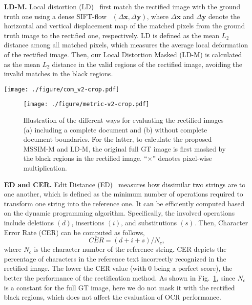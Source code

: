 \documentclass[lettersize,journal]{IEEEtran}
\begin{document}
\smallskip
\textbf{LD-M.} Local distortion (LD)~\cite{Shaodi} first match the rectified image with the ground truth one using a dense SIFT-flow~\cite{5551153} $(\Delta \bm{x}, \Delta \bm{y})$, where $\Delta \bm{x}$ and $\Delta \bm{y}$ denote the horizontal and vertical displacement map of the matched pixels from the ground truth image to the rectified one, respectively.
LD is defined as the mean $L_2$ distance among all matched pixels, which measures the average local deformation of the rectified image.
Then, our Local Distortion Masked (LD-M) is calculated as the mean $L_2$ distance in the valid regions of the rectified image,
avoiding the invalid matches in the black regions.

\begin{figure*}[t]
  \centering
  \texttt{[image: ./figure/com\_v2-crop.pdf]}
  \caption{Qualitative comparisons with existing learning-based methods, including DocUNet~\cite{8578592}, DocProj~\cite{li2019document}, 
  FCN-based~\cite{xie2020dewarping}, DewarpNet~\cite{9010747}, PWUNet~\cite{das2021end}, DocTr~\cite{feng2021doctr}, DDCP~\cite{xie2021document}, DocGeoNet~\cite{feng2022geometric}, Marior~\cite{zhang2022marior}, RDGR~\cite{jiang2022revisiting}, and our DocTr++, from left to right.}
  \label{fig:qua_eva1}
\end{figure*}

\begin{figure}[t]
  \centering
  \texttt{[image: ./figure/metric-v2-crop.pdf]}
  \caption{Illustration of the different ways for evaluating the rectified images (a) including a complete document and (b) without complete document boundaries. For the latter, to calculate the proposed MSSIM-M and LD-M, the original full GT image is first masked by the black regions in the rectified image. ``$\times$'' denotes pixel-wise multiplication.}
  \label{fig:metric}
\end{figure}

\smallskip
\textbf{ED and CER.} Edit Distance (ED)~\cite{levenshtein1966binary} measures how dissimilar two strings are to one another, which is defined as the minimum number of operations required to transform one string into the reference one. It can be efficiently computed based on the dynamic programming algorithm. Specifically, the involved operations include deletions $(d)$, insertions $(i)$, and substitutions $(s)$. Then, Character Error Rate (CER) can be computed as follows,
\begin{equation}\label{equ:cer}
CER=(d+i+s)/{N_c} ,
\end{equation}
where $N_c$ is the character number of the reference string. CER depicts the percentage of characters in the reference text incorrectly recognized in the rectified image. The lower the CER value (with 0 being a perfect score), the better the performance of the rectification method.
As shown in Fig.~\ref{fig:metric}, since $N_c$ is a constant for the full GT image, 
here we do not mask it with the rectified black regions,
which does not affect the evaluation of OCR performance.
\end{document}

